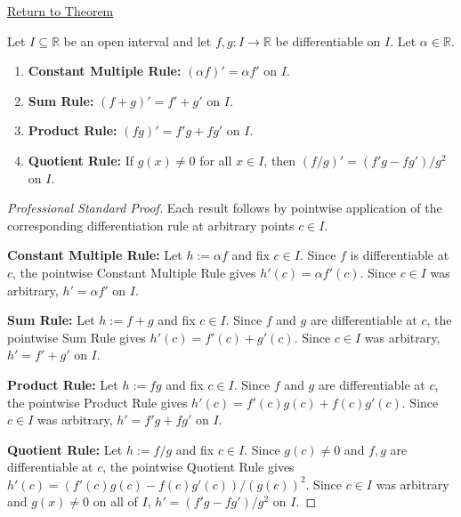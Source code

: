 \newpage
{}
\label{prf:differentiation-on-set}

\begin{remark*}[Return]
\hyperref[thm:finite-linear-combination-rule-interval]{Return to Theorem}
\end{remark*}

\begin{theorem*}
Let $I \subseteq \mathbb{R}$ be an open interval and let $f, g : I \to \mathbb{R}$ be differentiable on $I$. Let $\alpha \in \mathbb{R}$.
\begin{enumerate}
  \item \textbf{Constant Multiple Rule:} $(\alpha f)' = \alpha f'$ on $I$.
  \item \textbf{Sum Rule:} $(f + g)' = f' + g'$ on $I$.
  \item \textbf{Product Rule:} $(fg)' = f'g + fg'$ on $I$.
  \item \textbf{Quotient Rule:} If $g(x) \neq 0$ for all $x \in I$, then $(f/g)' = (f'g - fg')/g^2$ on $I$.
\end{enumerate}
\end{theorem*}

\begin{proof}[Professional Standard Proof]
\LRAProofBodyStart
Each result follows by pointwise application of the corresponding differentiation rule at arbitrary points $c \in I$.

\textbf{Constant Multiple Rule:} Let $h := \alpha f$ and fix $c \in I$. Since $f$ is differentiable at $c$, the pointwise Constant Multiple Rule gives $h'(c) = \alpha f'(c)$. Since $c \in I$ was arbitrary, $h' = \alpha f'$ on $I$.

\textbf{Sum Rule:} Let $h := f + g$ and fix $c \in I$. Since $f$ and $g$ are differentiable at $c$, the pointwise Sum Rule gives $h'(c) = f'(c) + g'(c)$. Since $c \in I$ was arbitrary, $h' = f' + g'$ on $I$.

\textbf{Product Rule:} Let $h := fg$ and fix $c \in I$. Since $f$ and $g$ are differentiable at $c$, the pointwise Product Rule gives $h'(c) = f'(c)g(c) + f(c)g'(c)$. Since $c \in I$ was arbitrary, $h' = f'g + fg'$ on $I$.

\textbf{Quotient Rule:} Let $h := f/g$ and fix $c \in I$. Since $g(c) \neq 0$ and $f, g$ are differentiable at $c$, the pointwise Quotient Rule gives $h'(c) = (f'(c)g(c) - f(c)g'(c))/(g(c))^2$. Since $c \in I$ was arbitrary and $g(x) \neq 0$ on all of $I$, $h' = (f'g - fg')/g^2$ on $I$.
\end{proof}

